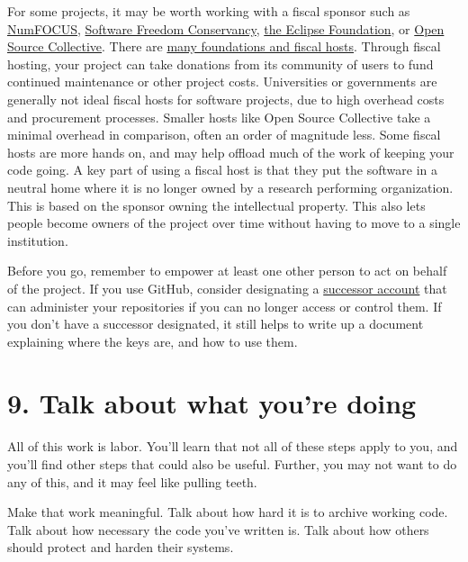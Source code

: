 \documentclass[10pt,letterpaper]{article}
\begin{document}
For some projects,
it may be worth working with a fiscal sponsor such as
\href{https://numfocus.org/}{NumFOCUS},
\href{https://sfconservancy.org/}{Software Freedom Conservancy},
\href{https://www.eclipse.org/}{the Eclipse Foundation},
or \href{https://oscollective.org/}{Open Source Collective}.
There are \href{https://sustainoss.org/academic-map/organizations/index.html}{many foundations and fiscal hosts}.
Through fiscal hosting,
your project can take donations from its community of users to fund continued maintenance or other project costs.
Universities or governments are generally not ideal fiscal hosts for software projects,
due to high overhead costs and procurement processes.
Smaller hosts like Open Source Collective take a minimal overhead in comparison,
often an order of magnitude less.
Some fiscal hosts are more hands on,
and may help offload much of the work of keeping your code going.
A key part of using a fiscal host is that
they put the software in a neutral home where it is no longer owned by a research performing organization.
This is based on the sponsor owning the intellectual property.
This also lets people become owners of the project over time
without having to move to a single institution.

Before you go,
remember to empower at least one other person to act on behalf of the project.
If you use GitHub,
consider designating a
\href{https://docs.github.com/en/account-and-profile/setting-up-and-managing-your-personal-account-on-github/managing-access-to-your-personal-repositories/maintaining-ownership-continuity-of-your-personal-accounts-repositories}{successor account}
that can administer your repositories if you can no longer access or control them.
If you don't have a successor designated,
it still helps to write up a document explaining where the keys are,
and how to use them.

\section*{9. Talk about what you're doing}

All of this work is labor.
You'll learn that not all of these steps apply to you,
and you'll find other steps that could also be useful.
Further, you may not want to do any of this, and it may feel like pulling teeth.

Make that work meaningful.
Talk about how hard it is to archive working code.
Talk about how necessary the code you've written is.
Talk about how others should protect and harden their systems.
\end{document}

